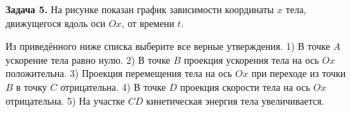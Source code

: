 \begin{taskbasic}[code={\label{task:dem26_v13_n5}}]
\textbf{Задача 5.} На рисунке показан график зависимости координаты $x$ тела, движущегося вдоль оси $Ox$, от времени $t$. 

\nopagebreak\smallskip
\begin{center}
\end{center}

Из приведённого ниже списка выберите все верные утверждения.
1) В точке $A$ ускорение тела равно нулю.
2) В точке $B$ проекция ускорения тела на ось $Ox$ положительна.
3) Проекция перемещения тела на ось $Ox$ при переходе из точки $B$ в точку $C$ отрицательна.
4) В точке $D$ проекция скорости тела на ось $Ox$ отрицательна.
5) На участке $CD$ кинетическая энергия тела увеличивается.

\end{taskbasic}



